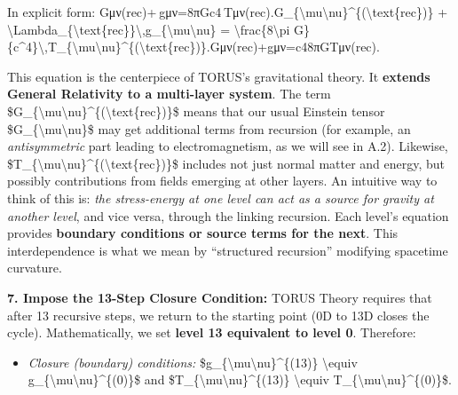 \documentclass[
]{article}
\begin{document}
In explicit form:
Gμν(rec)+\Lambdarec gμν=8πGc4 Tμν(rec).G\_\{\textbackslash mu\textbackslash nu\}\^{}\{(\textbackslash text\{rec\})\}
+
\textbackslash Lambda\_\{\textbackslash text\{rec\}\}\textbackslash,g\_\{\textbackslash mu\textbackslash nu\}
= \textbackslash frac\{8\textbackslash pi
G\}\{c\^{}4\}\textbackslash,T\_\{\textbackslash mu\textbackslash nu\}\^{}\{(\textbackslash text\{rec\})\}.Gμν(rec)\hspace{0pt}+\Lambdarec\hspace{0pt}gμν\hspace{0pt}=c48πG\hspace{0pt}Tμν(rec)\hspace{0pt}.

This equation is the centerpiece of TORUS's gravitational theory. It
\textbf{extends General Relativity to a multi-layer system}. The term
\$G\_\{\textbackslash mu\textbackslash nu\}\^{}\{(\textbackslash text\{rec\})\}\$
means that our usual Einstein tensor
\$G\_\{\textbackslash mu\textbackslash nu\}\$ may get additional terms
from recursion (for example, an \emph{antisymmetric} part leading to
electromagnetism, as we will see in A.2). Likewise,
\$T\_\{\textbackslash mu\textbackslash nu\}\^{}\{(\textbackslash text\{rec\})\}\$
includes not just normal matter and energy, but possibly contributions
from fields emerging at other layers. An intuitive way to think of this
is: \emph{the stress-energy at one level can act as a source for gravity
at another level}, and vice versa, through the linking recursion. Each
level's equation provides \textbf{boundary conditions or source terms
for the next}\hspace{0pt}. This interdependence is what we mean by
``structured recursion'' modifying spacetime curvature.

\textbf{7. Impose the 13-Step Closure Condition:} TORUS Theory requires
that after 13 recursive steps, we return to the starting point (0D to
13D closes the cycle). Mathematically, we set \textbf{level 13
equivalent to level 0}. Therefore:

\begin{itemize}
\item
  \emph{Closure (boundary) conditions:}
  \$g\_\{\textbackslash mu\textbackslash nu\}\^{}\{(13)\}
  \textbackslash equiv
  g\_\{\textbackslash mu\textbackslash nu\}\^{}\{(0)\}\$ and
  \$T\_\{\textbackslash mu\textbackslash nu\}\^{}\{(13)\}
  \textbackslash equiv
  T\_\{\textbackslash mu\textbackslash nu\}\^{}\{(0)\}\$\hspace{0pt}.
\end{itemize}
\end{document}
